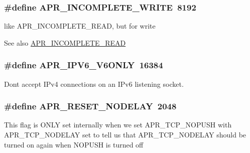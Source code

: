 \subsubsection[{\texorpdfstring{A\+P\+R\+\_\+\+I\+N\+C\+O\+M\+P\+L\+E\+T\+E\+\_\+\+W\+R\+I\+TE}{APR_INCOMPLETE_WRITE}}]{\setlength{\rightskip}{0pt plus 5cm}\#define A\+P\+R\+\_\+\+I\+N\+C\+O\+M\+P\+L\+E\+T\+E\+\_\+\+W\+R\+I\+TE~8192}\hypertarget{group__apr__sockopt_ga0c1544983845bf747b4a2a3facfb45e9}{}\label{group__apr__sockopt_ga0c1544983845bf747b4a2a3facfb45e9}
like A\+P\+R\+\_\+\+I\+N\+C\+O\+M\+P\+L\+E\+T\+E\+\_\+\+R\+E\+AD, but for write \begin{DoxySeeAlso}{See also}
\hyperlink{group__apr__sockopt_ga73b6c80791c5148c2a416e03a8a1ff8a}{A\+P\+R\+\_\+\+I\+N\+C\+O\+M\+P\+L\+E\+T\+E\+\_\+\+R\+E\+AD} 
\end{DoxySeeAlso}
\subsubsection[{\texorpdfstring{A\+P\+R\+\_\+\+I\+P\+V6\+\_\+\+V6\+O\+N\+LY}{APR_IPV6_V6ONLY}}]{\setlength{\rightskip}{0pt plus 5cm}\#define A\+P\+R\+\_\+\+I\+P\+V6\+\_\+\+V6\+O\+N\+LY~16384}\hypertarget{group__apr__sockopt_gae1126f69a19a23c484e3292b016375df}{}\label{group__apr__sockopt_gae1126f69a19a23c484e3292b016375df}
Don\textquotesingle{}t accept I\+Pv4 connections on an I\+Pv6 listening socket. 
\subsubsection[{\texorpdfstring{A\+P\+R\+\_\+\+R\+E\+S\+E\+T\+\_\+\+N\+O\+D\+E\+L\+AY}{APR_RESET_NODELAY}}]{\setlength{\rightskip}{0pt plus 5cm}\#define A\+P\+R\+\_\+\+R\+E\+S\+E\+T\+\_\+\+N\+O\+D\+E\+L\+AY~2048}\hypertarget{group__apr__sockopt_gac9ee12e841eefaf86fabaae4a298adea}{}\label{group__apr__sockopt_gac9ee12e841eefaf86fabaae4a298adea}
This flag is O\+N\+LY set internally when we set A\+P\+R\+\_\+\+T\+C\+P\+\_\+\+N\+O\+P\+U\+SH with A\+P\+R\+\_\+\+T\+C\+P\+\_\+\+N\+O\+D\+E\+L\+AY set to tell us that A\+P\+R\+\_\+\+T\+C\+P\+\_\+\+N\+O\+D\+E\+L\+AY should be turned on again when N\+O\+P\+U\+SH is turned off 
